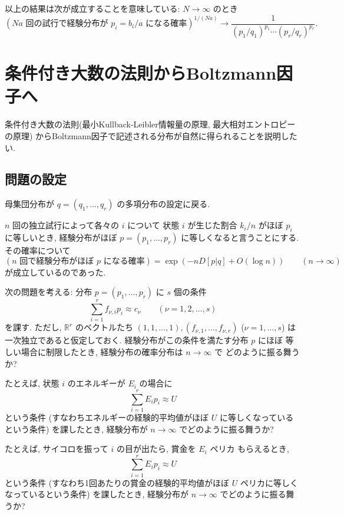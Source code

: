 \documentclass[12pt,twoside]{jarticle}
\newcommand\R{{\mathbb R}} %
\theoremstyle{definition} %
\theoremstyle{definition} %
\theoremstyle{definition} %
\numberwithin{theorem}{section}
\numberwithin{equation}{section}
\numberwithin{figure}{section}
\numberwithin{table}{section}
\begin{document}
以上の結果は次が成立することを意味している: $N\to\infty$ のとき
\[
(\text{$Na$ 回の試行で経験分布が $p_i=b_i/a$ になる確率})^{1/(Na)}\to\frac{1}{(p_1/q_1)^{p_1}\cdots(p_r/q_r)^{p_r}}.
\]



\section{条件付き大数の法則からBoltzmann因子へ}
\label{sec:Boltzmann-factors}

条件付き大数の法則(最小Kullback-Leibler情報量の原理, 最大相対エントロピーの原理)
からBoltzmann因子で記述される分布が自然に得られることを説明したい.


\subsection{問題の設定}

母集団分布が $q=(q_1,\ldots,q_r)$ の多項分布の設定に戻る.

$n$ 回の独立試行によって各々の $i$ について
状態 $i$ が生じた割合 $k_i/n$ がほぼ $p_i$ に等しいとき, 
経験分布がほぼ $p=(p_1,\ldots,p_r)$ に等しくなると言うことにする.
その確率について 
\[
(\text{$n$ 回で経験分布がほぼ $p$ になる確率})
=
\exp(-n D[p|q] + O(\log n))
\qquad (n\to\infty)
\]
が成立しているのであった. 

次の問題を考える: 分布 $p=(p_1,\ldots,p_r)$ に $s$ 個の条件
\[
\sum_{i=1}^r f_{\nu,i}p_i \approx c_\nu
\qquad (\nu=1,2,\ldots,s)
\tag{$*$}
\]
を課す. 
ただし, $\R^r$ のベクトルたち $(1,1,\ldots,1),(f_{\nu,1},\ldots,f_{\nu,r})$ 
($\nu=1,\ldots,s$) は一次独立であると仮定しておく.
経験分布がこの条件を満たす分布 $p$ にほぼ
等しい場合に制限したとき, 経験分布の確率分布は $n\to\infty$ で
どのように振る舞うか?

たとえば, 状態 $i$ のエネルギーが $E_i$ の場合に
\[
\sum_{i=1}^r E_i p_i \approx U
\]
という条件
(すなわちエネルギーの経験的平均値がほぼ $U$ に等しくなっているという条件)
を課したとき, 経験分布が $n\to\infty$ でどのように振る舞うか?

たとえば, サイコロを振って $i$ の目が出たら, 賞金を $E_i$ ペリカ
もらえるとき,
\[
\sum_{i=1}^r E_i p_i \approx U
\]
という条件
(すなわち1回あたりの賞金の経験的平均値がほぼ $U$ ペリカに等しくなっているという条件)
を課したとき, 経験分布が $n\to\infty$ でどのように振る舞うか?
\end{document}
